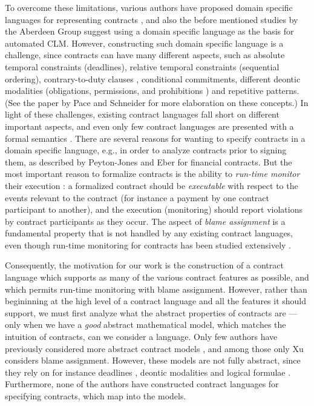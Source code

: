 \documentclass[orivec,final]{llncs-href}
\begin{document}
To overcome these limitations, various authors have proposed domain
specific languages for representing contracts
\cite{lee88electroniccontracting,goodchild00b2b,boulmakoul02integratedcontract,governatori06formalbcl,andersen06contracts,prisacariu07cl,governatori09drcontract},
and also the before mentioned studies by the Aberdeen Group suggest
using a domain specific language as the basis for automated
CLM. However, constructing such domain specific language is a
challenge, since contracts can have many different aspects, such as
absolute temporal constraints (deadlines), relative temporal 
constraints (sequential ordering), contrary-to-duty clauses
\cite{prakken96ctd}, conditional commitments, different deontic
modalities (obligations, permissions, and prohibitions
\cite{wright51deonticlogic}) and repetitive patterns. (See the paper
by Pace and Schneider \cite{pace09challenges} for more elaboration on
these concepts.) In light of these challenges, existing contract
languages fall short on different important aspects, and even only few
contract languages are presented with a formal semantics
\cite{andersen06contracts,prisacariu07cl}. There are several
reasons for wanting to specify contracts in a domain specific
language, e.g., in order to analyze contracts prior to signing them,
as described by Peyton-Jones and Eber \cite{jones03contracts} for
financial contracts. But the most important reason to formalize
contracts is the ability to \emph{run-time monitor} their execution
\cite{leucker09rv}: a formalized contract should be \emph{executable}
with respect to the events relevant to the contract (for instance a
payment by one contract participant to another), and the execution
(monitoring) should report violations by contract participants as they
occur. The aspect of \emph{blame assignment} is a fundamental property
that is not handled by any existing contract languages, even though
run-time monitoring for contracts has been studied extensively
\cite{xu04multipartycontracts,governatori06formalbcl,goodchild00b2b,prisacariu07cl,andersen06contracts,molina04runtimemonitoring}.

Consequently, the motivation for our work is the construction of a
contract language which supports as many of the various contract
features as possible, and which permits run-time monitoring with blame
assignment. However, rather than begininning at the high level of a
contract language and all the features it should support, we must
first analyze what the abstract properties of contracts are 
--- only when we have a \emph{good} abstract mathematical model, which
matches the intuition of contracts, can we consider a language. 
Only few authors have previously considered more abstract contract models
\cite{xu04multipartycontracts,molina04runtimemonitoring,oren09towards},
and among those only Xu \cite{xu04multipartycontracts} considers blame
assignment. However, these models are not fully abstract, since they
rely on for instance deadlines \cite{xu04multipartycontracts}, deontic
modalities \cite{molina04runtimemonitoring} and logical formulae
\cite{oren09towards}. Furthermore, none of the authors have 
constructed contract languages for specifying contracts, which map
into the models.
\end{document}
